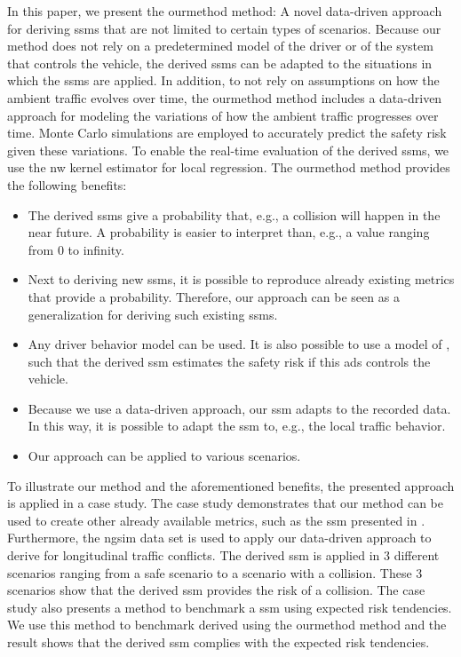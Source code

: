 \cstarta In this paper, we present the \ac{ourmethod} method: A novel data-driven approach for deriving \acp{ssm} that are not limited to certain types of scenarios.
Because our method does not rely on a predetermined model of the driver or of the system that controls the vehicle, the derived \acp{ssm} can be adapted to the situations in which the \acp{ssm} are applied. 
In addition, to not rely on assumptions on how the ambient traffic evolves over time, the \ac{ourmethod} method includes a data-driven approach for modeling the variations of how the ambient traffic progresses over time. 
Monte Carlo simulations are employed to accurately predict the safety risk given these variations.
To enable the real-time evaluation of the derived \acp{ssm}, we use the \ac{nw} kernel estimator \autocite{wasserman2006nonparametric} for local regression.
The \ac{ourmethod} method provides the following benefits: \cenda
\begin{itemize}
	\item The derived \acp{ssm} give a probability that, e.g., a collision will happen in the near future. 
	A probability is easier to interpret than, e.g., a value ranging from 0 to infinity.
	
	\item \cstarta Next to deriving new \acp{ssm}, \cenda it is possible to reproduce already existing metrics that provide a probability. 
	Therefore, our approach can be seen as a generalization for deriving such existing \acp{ssm}.
	
	\item Any driver behavior model can be used.
	It is also possible to use a model of , such that the derived \ac{ssm} estimates the safety risk if this \ac{ads} controls the vehicle.
	
	\item Because we use a data-driven approach, our \ac{ssm} adapts to the recorded data. 
	In this way, it is possible to \cstarta adapt the \ac{ssm} to, e.g., the local traffic behavior\cenda.
	
	\item Our approach can be applied to various scenarios.
\end{itemize}

To illustrate our method and the aforementioned benefits, the presented approach is applied in a case study.
The case study demonstrates that our method can be used to create other already available metrics, such as the \ac{ssm} presented in \autocite{wang2014evaluation}.
Furthermore, the \ac{ngsim} data set \autocite{kovvali2007video} is used to apply our data-driven approach to derive  for longitudinal traffic conflicts.
The derived \ac{ssm} is applied in 3 different scenarios ranging from a safe scenario to a scenario with a collision.
These 3 scenarios show that the derived \ac{ssm} provides the risk of a collision.
The case study also presents a method to benchmark a \ac{ssm} using expected risk tendencies.
\cstarta We use this method to benchmark  derived using the \ac{ourmethod} method and the result shows that the derived \ac{ssm} complies with the expected risk tendencies. \cenda

